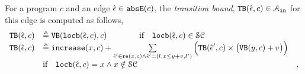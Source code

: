 \begin{enumerate}
\begin{defn}
 \label{def:edge_pathinsensitivebound}
 For a program $c$ and an edge $\hat{\mathtt{\epsilon}{}} \in \mathtt{abs}{\mathtt{E}}(c)$, the \emph{transition bound},
 ${\mathtt{TB}}(\hat{\mathtt{\epsilon}{}}, c) \in \mathcal{A}_{\mathtt{in}}$ 
for this edge is
computed as follows,
\[ 
\begin{array}{lll}
 {\ensuremath{\mathtt{TB}}}(\hat{\mathtt{\epsilon}{}}, c) 
 & \triangleq {\ensuremath{\mathtt{VB}}}(\mathtt{locb}(\hat{\mathtt{\epsilon}{}}, c), c) \qquad \qquad \text{if} \quad \mathtt{locb}(\hat{\mathtt{\epsilon}{}}, c) \in \mathcal{SC} & \\
 {\mathtt{TB}}(\hat{\mathtt{\epsilon}{}}, c) 
 & \triangleq \mathtt{increase}(x, c) 
 + 
 \sum\limits_{\hat{\mathtt{\epsilon}{}}' \in \mathtt{re}(x, c) \land \hat{\mathtt{\epsilon}{}}' = (l, x \leq y + v, l') }
 \Big( {\mathtt{TB}}(\hat{\mathtt{\epsilon}{}}', c) \times \big( {\mathtt{VB}}(y, c) + v \big) \Big)
 & \\
 & \text{if} \quad \mathtt{locb}(\hat{\mathtt{\epsilon}{}}, c) = x \land x \notin \mathcal{SC} & ,
\end{array}
 \]
\end{defn}


\end{enumerate}
